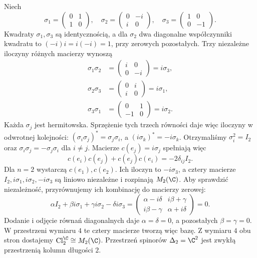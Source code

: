 \begin{przyklad}
\label{prz:pauli}
Niech
\[
 \sigma_1=\begin{pmatrix}0&1\\1&0\end{pmatrix},
 \quad
 \sigma_2=\begin{pmatrix}0&-i\\i&0\end{pmatrix},
 \quad
 \sigma_3=\begin{pmatrix}1&0\\0&-1\end{pmatrix}.
\]
Kwadraty $\sigma_1,\sigma_3$ są identycznością,
a dla $\sigma_2$ dwa diagonalne współczynniki kwadratu
to $(-i)i=i(-i)=1$, przy zerowych pozostałych.
Trzy niezależne iloczyny różnych macierzy wynoszą
\[
 \begin{aligned}
 \sigma_1\sigma_2&=\begin{pmatrix}i&0\\0&-i\end{pmatrix}
                  =i\sigma_3,\\
 \sigma_2\sigma_3&=\begin{pmatrix}0&i\\i&0\end{pmatrix}
                  =i\sigma_1,\\
 \sigma_3\sigma_1&=\begin{pmatrix}0&1\\-1&0\end{pmatrix}
                  =i\sigma_2.
 \end{aligned}
\]
Każda $\sigma_j$ jest hermitowska.
Sprzężenie tych trzech równości daje więc iloczyny w odwrotnej
kolejności: $(\sigma_i\sigma_j)^*=\sigma_j\sigma_i$,
a $(i\sigma_k)^*=-i\sigma_k$.
Otrzymaliśmy $\sigma_i^2=I_2$ oraz
$\sigma_i\sigma_j=-\sigma_j\sigma_i$ dla $i\ne j$.
Macierze $c(e_j)=i\sigma_j$ spełniają więc
\[
 c(e_i)c(e_j)+c(e_j)c(e_i)=-2\delta_{ij}I_2.
\]
Dla $n=2$ wystarczą $c(e_1),c(e_2)$.
Ich iloczyn to $-i\sigma_3$, a cztery macierze
$I_2,i\sigma_1,i\sigma_2,-i\sigma_3$
są liniowo niezależne i rozpinają
$M_2(\C)$. Aby sprawdzić niezależność, przyrównujemy
ich kombinację do macierzy zerowej:
\[
 \alpha I_2+\beta i\sigma_1+\gamma i\sigma_2-\delta i\sigma_3
 =\begin{pmatrix}
   \alpha-i\delta&i\beta+\gamma\\
   i\beta-\gamma&\alpha+i\delta
  \end{pmatrix}=0.
\]
Dodanie i odjęcie równań diagonalnych daje
$\alpha=\delta=0$, a pozostałych $\beta=\gamma=0$.
W przestrzeni wymiaru $4$ te cztery macierze tworzą więc bazę.
Z wymiaru $4$ obu stron dostajemy
$\operatorname{Cl}^{\C}_2\cong M_2(\C)$.
Przestrzeń spinorów $\Delta_2=\C^2$
jest zwykłą przestrzenią kolumn długości $2$.
\end{przyklad}

